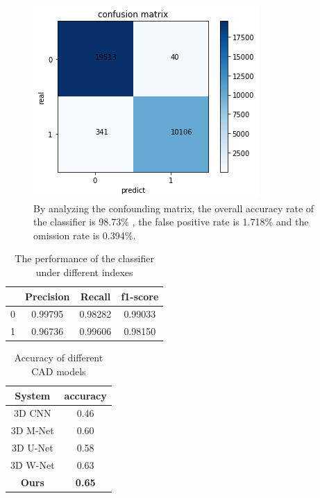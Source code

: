 \documentclass[conference]{IEEEtran}
\begin{document}
\begin{figure}[htbp]
    \centerline{\includegraphics[scale=0.5]{confusionmatrix.PNG}}
    \caption{By analyzing the confounding matrix, the overall accuracy rate of the classifier is 98.73$\%$
    , the false positive rate is 1.718$\%$ and the omission rate is 0.394$\%$.}
    \label{fig6}
    \end{figure}
    \begin{table}[!t]
        \caption{The performance of the classifier under different indexes}
        \label{table_time1}
        \setlength{\tabcolsep}{6.5mm}
        \begin{tabular}{cccc}
       \toprule
          & Precision & Recall & f1-score \\
       \midrule
        0 & 0.99795 & 0.98282 & 0.99033 \\
        1 & 0.96736 & 0.99606 & 0.98150 \\
         \bottomrule

       \end{tabular}

       \end{table}
       \begin{table}[!t]
        \caption{Accuracy of different CAD models}
        \label{table_time}
        \setlength{\tabcolsep}{15mm}
        \begin{tabular}{cc}

       \toprule

         System & accuracy \\

       \midrule

        3D CNN & 0.46   \\
        3D M-Net & 0.60 \\
        3D U-Net & 0.58 \\
        3D W-Net & 0.63 \\
       \textbf{Ours} & \textbf{0.65}   \\

         \bottomrule

       \end{tabular}

       \end{table}
\end{document}
